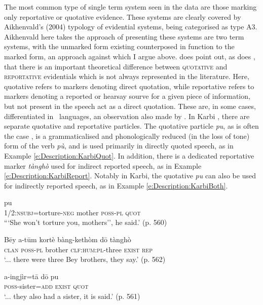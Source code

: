 The most common type of single term system seen in the data are those marking only reportative or quotative evidence. These systems are clearly covered by Aikhenvald's (2004) typology of evidential systems, being categorised as type A3. Aikhenvald here takes the approach of presenting these systems are two term systems, with the unmarked form existing counterposed in function to the marked form, an approach against which I argue above.  does point out, as does , that there is an important theoretical difference between \textsc{quotative} and \textsc{reportative} evidentials which is not always represented in the literature. Here, quotative refers to markers denoting direct quotation, while reportative refers to markers denoting a reported or hearsay sourve for a given piece of information, but not present in the speech act as a direct quotation. These are, in some cases, differentiated in \lfam\ languages, an observation also made by . 
In Karbi \cite[Internal isolate: India,][]{Konnerth2020}, there are separate quotative and reportative particles. The quotative particle \textit{pu}, as is often the case \cite{Gawne2021}, is a grammaticalised and phonologically reduced (in the loss of tone) form of the verb \textit{pù}, and is used primarily in directly quoted speech, as in Example \ref{e:Description:KarbiQuot}. In addition, there is a dedicated reportative marker \textit{tànghò} used for indirect reported speech, as in Example \ref{e:Description:KarbiReport}. Notably in Karbi, the quotative \textit{pu} can also be used for indirectly reported speech, as in Example \ref{e:Description:KarbiBoth}.

\begin{exe}
        \ex 
        \begin{xlist}
                \ex\label{e:Description:KarbiQuot}
                \gll [nang=chenék-Cē pēi a-tūm] pu \\
                1/2:\textsc{nsubj}=torture-\textsc{neg} mother \textsc{poss-pl} \textsc{quot} \\
                \glt ```She won't torture you, mothers'', he said.' (p. 560)

                \ex\label{e:Description:KarbiReport}
                \gll Bēy a-tūm kortè bàng-kethòm dō tànghò \\
                \textsc{clan} \textsc{poss-pl} brother \textsc{clf:hum:pl}-three \textsc{exist} \textsc{rep} \\
                \glt `... there were three Bey brothers, they say.' (p. 562)

                \ex\label{e:Description:KarbiBoth}
                \gll a-ingjìr=tā dō pu \\
                \textsc{poss}-sister=\textsc{add} \textsc{exist} \textsc{quot} \\
                \glt `... they also had a sister, it is said.' (p. 561)
        \end{xlist}
        \cite[Karbi,][]{Konnerth2020}
\end{exe}

